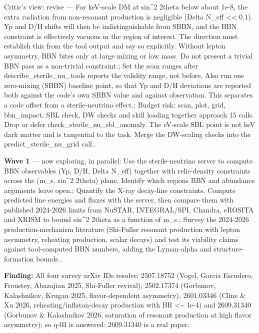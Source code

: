 \documentclass[11pt,a4paper]{article}
\begin{document}
\begin{enumerate}
Critic's view: revise --- For keV-scale DM at sin\textasciicircum{}2 2theta below about 1e-8, the extra radiation from non-resonant production is negligible (Delta N\_eff \textless{}\textless{} 0.1). Yp and D/H shifts will then be indistinguishable from SBBN, and the BBN constraint is effectively vacuous in the region of interest. The direction must establish this from the tool output and say so explicitly. Without lepton asymmetry, BBN bites only at large mixing or low mass. Do not present a trivial BBN pass as a non-trivial constraint.; Set the scan ranges after describe\_sterile\_nu\_tools reports the validity range, not before. Also run one zero-mixing (SBBN) baseline point, so that Yp and D/H deviations are reported both against the code's own SBBN value and against observation. This separates a code offset from a sterile-neutrino effect.; Budget risk: scan, plot, grid, bbn\_impact, SBL check, DW checks and skill loading together approach 15 calls. Drop or defer check\_sterile\_nu\_sbl\_anomaly. The eV-scale SBL point is not keV dark matter and is tangential to the task. Merge the DW-scaling checks into the predict\_sterile\_nu\_grid call..

\end{enumerate}
\textbf{Wave 1} --- now exploring, in parallel: Use the sterile-neutrino server to compute BBN observables (Yp, D/H, Delta N\_eff) together with relic-density constraints across the (m\_s, sin\textasciicircum{}2 2theta) plane. Identify which regions BBN and abundance arguments leave open.; Quantify the X-ray decay-line constraints. Compute predicted line energies and fluxes with the server, then compare them with published 2024-2026 limits from NuSTAR, INTEGRAL/SPI, Chandra, eROSITA and XRISM to bound sin\textasciicircum{}2 2theta as a function of m\_s.; Survey the 2024-2026 production-mechanism literature (Shi-Fuller resonant production with lepton asymmetry, reheating production, scalar decays) and test its viability claims against tool-computed BBN numbers, adding the Lyman-alpha and structure-formation bounds..

\textbf{Finding:} All four survey arXiv IDs resolve: 2507.18752 (Vogel, Garcia Escudero, Froustey, Abazajian 2025, Shi-Fuller revival), 2502.17374 (Gorbunov, Kalashnikov, Krugan 2025, flavor-dependent asymmetry), 2601.03346 (Cline \& Xu 2026, reheating/inflaton-decay production with BR \textless{}\textasciitilde{} 1e-4) and 2609.31340 (Gorbunov \& Kalashnikov 2026, saturation of resonant production at high flavor asymmetry); so q-03 is answered: 2609.31340 is a real paper.
\end{document}
